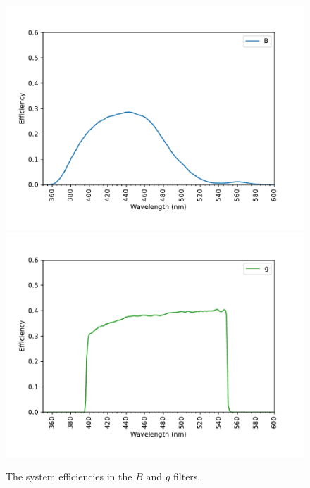 \begin{figure}
\centering
\includegraphics[width=0.80\linewidth]{figure/system-B.pdf}
\includegraphics[width=0.80\linewidth]{figure/system-g.pdf}
\caption{The system efficiencies in the $B$ and $g$ filters.}
\label{figure:system-filters-first}
\end{figure}

